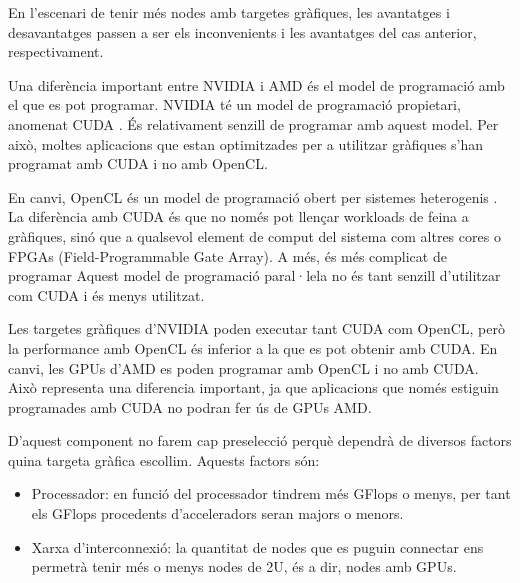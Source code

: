 En l'escenari de tenir més nodes amb targetes gràfiques, les avantatges i desavantatges passen a ser els inconvenients i les avantatges del cas anterior, respectivament.

Una diferència important entre NVIDIA i AMD és el model de programació amb el que es pot programar. 
NVIDIA té un model de programació propietari, anomenat CUDA \cite{gpu_cuda}. És relativament senzill de programar amb aquest model. Per això, moltes aplicacions que estan optimitzades per a utilitzar gràfiques s'han programat amb CUDA i no amb OpenCL.

En canvi, OpenCL és un model de programació obert per sistemes heterogenis \cite{gpu_opencl}. La diferència amb CUDA és que no només pot llençar workloads de feina a gràfiques, sinó que a qualsevol element de comput del sistema com altres cores o FPGAs (Field-Programmable Gate Array). A més, és més complicat de programar
Aquest model de programació paral·lela no és tant senzill d'utilitzar com CUDA i és menys utilitzat.

Les targetes gràfiques d'NVIDIA poden executar tant CUDA com OpenCL, però la performance amb OpenCL és inferior a la que es pot obtenir amb CUDA. En canvi, les GPUs d'AMD es poden programar amb OpenCL i no amb CUDA. 
Això representa una diferencia important, ja que aplicacions que només estiguin programades amb CUDA no podran fer ús de GPUs AMD.

D'aquest component no farem cap preselecció perquè dependrà de diversos factors quina targeta gràfica escollim. Aquests factors són: 
\begin{itemize}
    \item Processador: en funció del processador tindrem més GFlops o menys, per tant els GFlops procedents d'acceleradors seran majors o menors.
    \item Xarxa d'interconnexió: la quantitat de nodes que es puguin connectar ens permetrà tenir més o menys nodes de 2U, és a dir, nodes amb GPUs.
\end{itemize}
